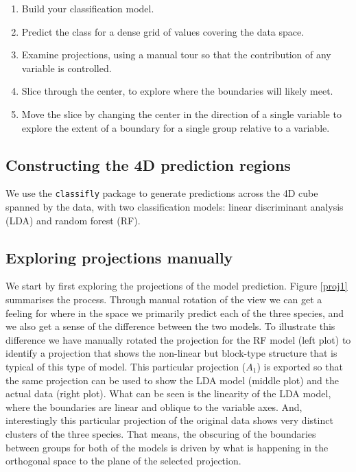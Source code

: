 \documentclass[]{interact}
\theoremstyle{plain}%
\theoremstyle{definition}
\theoremstyle{remark}
\providecommand{\tightlist}{%
  \setlength{\itemsep}{0pt}\setlength{\parskip}{0pt}}
\def\tightlist{}
\begin{document}
\begin{enumerate}
\def\labelenumi{\arabic{enumi}.}
\tightlist
\item
  Build your classification model.
\item
  Predict the class for a dense grid of values covering the data space.
\item
  Examine projections, using a manual tour so that the contribution of
  any variable is controlled.
\item
  Slice through the center, to explore where the boundaries will likely
  meet.
\item
  Move the slice by changing the center in the direction of a single
  variable to explore the extent of a boundary for a single group
  relative to a variable.
\end{enumerate}

\hypertarget{constructing-the-4d-prediction-regions}{%
\subsection{Constructing the 4D prediction
regions}\label{constructing-the-4d-prediction-regions}}

We use the \texttt{classifly} package \citep{classifly} to generate
predictions across the 4D cube spanned by the data, with two
classification models: linear discriminant analysis (LDA) and random
forest (RF).

\hypertarget{exploring-projections-manually}{%
\subsection{Exploring projections
manually}\label{exploring-projections-manually}}

We start by first exploring the projections of the model prediction.
Figure \ref{proj1} summarises the process. Through manual rotation of
the view we can get a feeling for where in the space we primarily
predict each of the three species, and we also get a sense of the
difference between the two models. To illustrate this difference we have
manually rotated the projection for the RF model (left plot) to identify
a projection that shows the non-linear but block-type structure that is
typical of this type of model. This particular projection (\(A_1\)) is
exported so that the same projection can be used to show the LDA model
(middle plot) and the actual data (right plot). What can be seen is the
linearity of the LDA model, where the boundaries are linear and oblique
to the variable axes. And, interestingly this particular projection of
the original data shows very distinct clusters of the three species.
That means, the obscuring of the boundaries between groups for both of
the models is driven by what is happening in the orthogonal space to the
plane of the selected projection.
\end{document}
